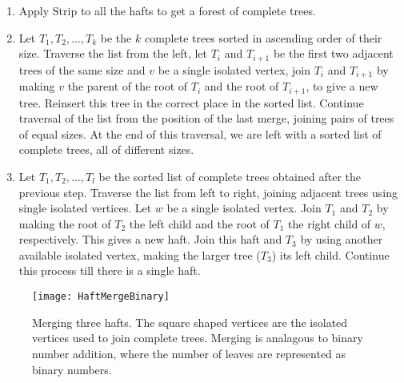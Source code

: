\documentclass[11pt, letter]{article}
\newcommand{\Strip}{\mathrm{Strip}}
\begin{document}
\begin{enumerate}
\item Apply $\Strip$ to all the hafts to get a forest of  complete trees.
\item Let $T_{1} , T_{2}, \ldots, T_{k}$ be the $k$ complete trees sorted in ascending order of their
size. Traverse the list from the left, let $T_{i}$ and $T_{i+1}$ be the first two adjacent trees of the same size and $v$ be a
single isolated vertex, join $T_{i}$ and $T_{i+1}$ by making $v$ the parent of the root of $T_{i}$ and the root of
$T_{i+1}$, to give a new tree. Reinsert this tree in the correct place in the sorted list. Continue traversal of the
list from the position of the last merge, joining pairs of trees of equal sizes. At the end of this traversal, we are
left with a sorted list of complete trees, all of different sizes.
\item Let $T_1, T_2, \ldots,  T_l$   be the sorted list of complete trees obtained after the previous step. Traverse
the list from left to right, joining adjacent trees using single isolated vertices.  Let $w$ be a single isolated
vertex. Join $T_1$ and $T_2$ by making the root of $T_2$ the left child and the root of $T_{1}$ the right child of
$w$, respectively. This gives a new haft. Join this haft and $T_3$  by using another available isolated
vertex, making the larger tree ($T_{3}$)  its left child. Continue this process till there is a single haft.
\end{enumerate}


\begin{figure}[h!]
\centering
\texttt{[image: HaftMergeBinary]}
\caption{Merging three hafts. The square shaped vertices are the isolated vertices used to join complete trees.
Merging is analagous to binary number addition, where the number of leaves are represented as binary numbers.}
\label{fig: haftmergebinary}
\end{figure}
\end{document}
